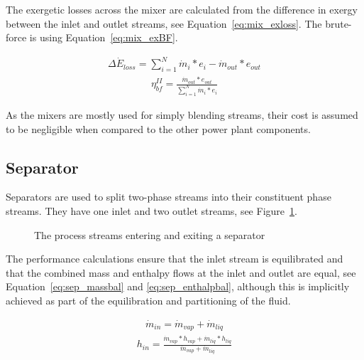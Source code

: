         The exergetic losses across the mixer are calculated from the difference in exergy between the inlet and outlet streams, see Equation~\ref{eq:mix_exloss}. The brute-force is using Equation~\ref{eq:mix_exBF}.
        
        \begin{align}
            \Delta\Dot{E}_{loss} = \sum_{i=1}^N\Dot{m}_i*e_i - \Dot{m}_{out}*e_{out} \label{eq:mix_exloss}
        \end{align}
        \begin{align}
            \eta_{bf}^{II}= \frac{\Dot{m}_{out}*e_{out}}{\sum_{i=1}^N\Dot{m}_i*e_i} \label{eq:mix_exBF}
        \end{align}

        As the mixers are mostly used for simply blending streams, their cost is assumed to be negligible when compared to the other power plant components.
    
    \subsection{Separator}
        Separators are used to split two-phase streams into their constituent phase streams. They have one inlet and two outlet streams, see Figure~\ref{fig:separator_schematic}.

        \begin{figure}[H]
            \centering
            
            \caption{The process streams entering and exiting a separator}
            \label{fig:separator_schematic}
        \end{figure}

        The performance calculations ensure that the inlet stream is equilibrated and that the combined mass and enthalpy flows at the inlet and outlet are equal, see Equation~\ref{eq:sep_massbal} and \ref{eq:sep_enthalpbal}, although this is implicitly achieved as part of the equilibration and partitioning of the fluid. 
        
        \begin{align} 
            \Dot{m}_{in} = \Dot{m}_{vap} + \Dot{m}_{liq} \label{eq:sep_massbal}
        \end{align}
        \begin{align}
            h_{in} = \frac{\Dot{m}_{vap}*h_{vap} + \Dot{m}_{liq}*h_{liq}}{\Dot{m}_{vap} + \Dot{m}_{liq}} \label{eq:sep_enthalpbal}
        \end{align}

